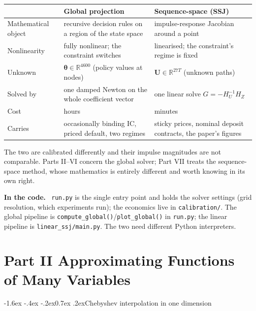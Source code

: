 \documentclass[10pt,a4paper]{article}
\makeatletter
\theoremstyle{definition}
\theoremstyle{plain}
\theoremstyle{remark}
\newenvironment{codehint}%
  {\par\vspace{2pt}\begin{framed}\noindent\small\textcolor{codeblue}{\textbf{In the code.}}\ }%
  {\end{framed}\vspace{2pt}}
\newcommand{\file}[1]{\textcolor{codeblue}{\texttt{#1}}}
\newcommand{\code}[1]{\texttt{#1}}
\newcommand{\R}{\mathbb{R}}
\newcommand{\pol}{\bm{\theta}}
\renewcommand\section{\@startsection{section}{1}{\z@}%
  {-1.6ex \@plus -.4ex \@minus -.2ex}{0.7ex \@plus.2ex}{\normalfont\large\bfseries}}
\makeatother
\begin{document}
\begin{center}
\small
\begin{tabular}{@{}p{}p{}p{}@{}}
\toprule
 & \textbf{Global projection} & \textbf{Sequence-space (SSJ)} \\
\midrule
Mathematical object & recursive decision rules on a region of the state space & impulse-response
Jacobian around a point \\
Nonlinearity & fully nonlinear; the constraint switches & linearised; the constraint's regime
is fixed \\
Unknown & $\pol\in\R^{4600}$ (policy values at nodes) & $\mathbf{U}\in\R^{27T}$ (unknown paths) \\
Solved by & one damped Newton on the whole coefficient vector & one linear solve
$G=-H_U^{-1}H_Z$ \\
Cost & hours & minutes \\
Carries & occasionally binding IC, priced default, two regimes & sticky prices, nominal
deposit contracts, the paper's figures \\
\bottomrule
\end{tabular}
\end{center}

\noindent The two are calibrated differently and their impulse magnitudes are not
comparable. Parts II--VI concern the global solver; Part VII treats the sequence-space
method, whose mathematics is entirely different and worth knowing in its own right.

\begin{codehint}
\file{run.py} is the single entry point and holds the solver settings (grid resolution,
which experiments run); the economics live in \file{calibration/}. The global pipeline is
\code{compute\_global()}/\code{plot\_global()} in \file{run.py}; the linear pipeline is
\file{linear\_ssj/main.py}. The two need different Python interpreters.
\end{codehint}

\vspace{-4pt}\part*{Part II \quad Approximating Functions of Many Variables}
\section{Chebyshev interpolation in one dimension}
\label{sec:cheb}
\end{document}
